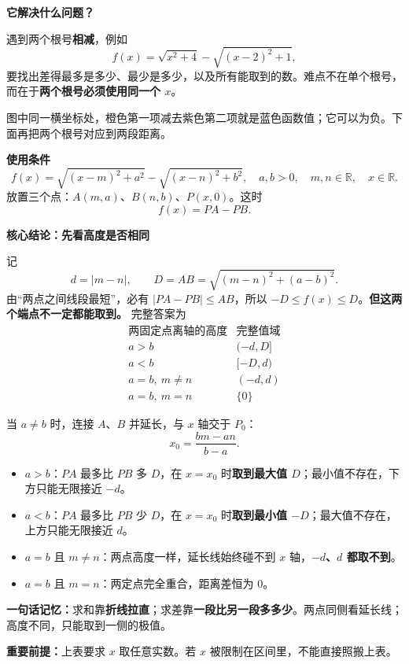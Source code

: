 \begin{statementbox}
\textbf{\textcolor{CStatement}{它解决什么问题？}}



遇到两个根号\textbf{相减}，例如
\[
 f(x)=\sqrt{x^2+4}-\sqrt{(x-2)^2+1},
\]
要找出差得最多是多少、最少是多少，以及所有能取到的数。难点不在单个根号，而在于\textbf{两个根号必须使用同一个 $x$}。

图中同一横坐标处，橙色第一项减去紫色第二项就是蓝色函数值；它可以为负。下面再把两个根号对应到两段距离。

\medskip
\end{statementbox}
\clearpage
\begin{statementbox}
\textbf{\textcolor{CStatement}{使用条件}}
\[
 \boxed{f(x)=\sqrt{(x-m)^2+a^2}-\sqrt{(x-n)^2+b^2}},
 \quad a,b>0,\quad m,n\in\mathbb R,\quad x\in\mathbb R.
\]
放置三个点：$A(m,a)$、$B(n,b)$、$P(x,0)$。这时
\[
 f(x)=PA-PB.
\]

\end{statementbox}
\clearpage
\begin{statementbox}
\textbf{\textcolor{CStatement}{核心结论：先看高度是否相同}}

记
\[
 d=|m-n|,\qquad D=AB=\sqrt{(m-n)^2+(a-b)^2}.
\]
由“两点之间线段最短”，必有 $|PA-PB|\leq AB$，所以 $-D\leq f(x)\leq D$。\textbf{但这两个端点不一定都能取到。} 完整答案为
\[
 \boxed{\begin{array}{c|c}
 \text{两固定点离轴的高度}&\text{完整值域}\\\hline
 a>b&(-d,D]\\
 a<b&[-D,d)\\
 a=b,\ m\ne n&(-d,d)\\
 a=b,\ m=n&\{0\}
 \end{array}}
\]

当 $a\ne b$ 时，连接 $A$、$B$ 并延长，与 $x$ 轴交于 $P_0$：
\[
 \boxed{x_0=\frac{bm-an}{b-a}}.
\]
\begin{itemize}[leftmargin=*,itemsep=.25em]
\item $a>b$：$PA$ 最多比 $PB$ 多 $D$，在 $x=x_0$ 时\textbf{取到最大值 $D$}；最小值不存在，下方只能无限接近 $-d$。
\item $a<b$：$PA$ 最多比 $PB$ 少 $D$，在 $x=x_0$ 时\textbf{取到最小值 $-D$}；最大值不存在，上方只能无限接近 $d$。
\item $a=b$ 且 $m\ne n$：两点高度一样，延长线始终碰不到 $x$ 轴，\textbf{$-d$、$d$ 都取不到}。
\item $a=b$ 且 $m=n$：两定点完全重合，距离差恒为 $0$。
\end{itemize}

\textbf{一句话记忆：}求和靠\textbf{折线拉直}；求差靠\textbf{一段比另一段多多少}。两点同侧看延长线；高度不同，只能取到一侧的极值。

\textbf{重要前提：}上表要求 $x$ 取任意实数。若 $x$ 被限制在区间里，不能直接照搬上表。
\end{statementbox}
